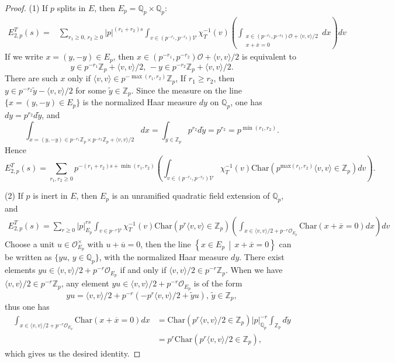 \documentclass[12pt]{article}
\theoremstyle{remark}
\theoremstyle{definition}
\newcommand{\oo}{\mathcal{O}}
\newcommand{\Z}{\mathbb{Z}}
\newcommand{\Q}{\mathbb{Q}}
\newcommand{\lrangle}[2]{\langle #1,#2\rangle}
\newcommand{\rmm}[1]{\mathrm{#1}}
\newcommand{\midline}{\,\middle\vert\,}
\newcommand{\set}[2]{\left\{#1\midline #2\right\}}
\newcommand{\call}[1]{\mathcal{#1}}
\begin{document}
\begin{proof}
    (1) If $p$ splits in $E$, then
$E_{p}=\Q_{p}\times\Q_{p}$:
\begin{align*}
    E_{2,p}^{T}(s)=&\sum_{r_{1}\geq 0,\,r_{2}\geq 0}|p|^{(r_{1}+r_{2})s}\int_{v\in (p^{-r_{1}},p^{-r_{2}})\call{V}}\chi_{T}^{-1}(v)\left(\int_{\substack{x\in (p^{-r_{1}},p^{-r_{2}})\oo+\lrangle{v}{v}/2\\ x+\overline{x}=0}}dx\right)dv
\end{align*}
If we write $x=(y,-y)\in E_{p}$,
then $x\in (p^{-r_{1}},p^{-r_{2}})\oo+\lrangle{v}{v}/2$ is equivalent to 
\[y\in p^{-r_{1}}\Z_{p}+\lrangle{v}{v}/2,\,-y\in p^{-r_{2}}\Z_{p}+\lrangle{v}{v}/2.\]
There are such $x$ only if $\lrangle{v}{v}\in p^{-\max(r_{1},r_{2})}\Z_{p}$,
If $r_{1}\geq r_{2}$,
then $y\in p^{-r_{2}}\widetilde{y}-\lrangle{v}{v}/2$ for some $\widetilde{y}\in \Z_{p}$.
Since the measure on the line $\{x=(y,-y)\in E_{p}\}$ is the normalized Haar measure $dy$ on $\Q_{p}$,
one has $dy=p^{r_{2}}d\widetilde{y}$,
and 
\[\int_{x=(y,-y)\in p^{-r_{1}}\Z_{p}\times p^{-r_{2}}\Z_{p}+\lrangle{v}{v}/2}dx=\int_{\widetilde{y}\in \Z_{p}}p^{r_{2}}d\widetilde{y}=p^{r_{2}}=p^{\min(r_{1},r_{2})}.\]
Hence
\[E_{2,p}^{T}(s)=\sum_{r_{1},r_{2}\geq 0}p^{-(r_{1}+r_{2})s+\min(r_{1},r_{2})}\left(\int_{v\in (p^{-r_{1}},p^{-r_{2}})\call{V}}\chi_{T}^{-1}(v)\rmm{Char}(p^{\rmm{max}(r_{1},r_{2})}\lrangle{v}{v}\in \Z_{p})dv\right).\]

(2) If $p$ is inert in $E$,
then $E_{p}$ is an unramified quadratic field extension of $\Q_{p}$, 
and 
\begin{align*}
    E_{2,p}^{T}(s)=\sum_{r\geq 0}|p|_{E_{p}}^{rs}\int_{v\in p^{-r}\call{V}}\chi_{T}^{-1}(v)\rmm{Char}(p^{r}\lrangle{v}{v}\in\Z_{p})\left(\int_{x\in\lrangle{v}{v}/2+p^{-r}\oo_{E_{p}}}\rmm{Char}(x+\overline{x}=0)dx\right)dv
\end{align*}
Choose a unit $u\in \oo_{E_{p}}^{\times}$ with $u+\overline{u}=0$,
then the line $\set{x\in E_{p}}{x+\overline{x}=0}$ can be written as $\{yu,\,y\in \Q_{p}\}$,
with the normalized Haar measure $dy$.
There exist elements $yu\in \lrangle{v}{v}/2+p^{-r}\oo_{E_{p}}$ if and only if $\lrangle{v}{v}/2\in p^{-r}\Z_{p}$.
When we have $\lrangle{v}{v}/2\in p^{-r}\Z_{p}$,
any element $yu\in\lrangle{v}{v}/2+p^{-r}\oo_{E_{p}}$ is of the form 
\[yu=\lrangle{v}{v}/2+p^{-r}\left(-p^{r}\lrangle{v}{v}/2+\widetilde{y}u\right),\,\widetilde{y}\in \Z_{p},\]
thus one has 
\begin{align*}
    \int_{x\in\lrangle{v}{v}/2+p^{-r}\oo_{E_{p}}}\rmm{Char}(x+\overline{x}=0)dx&=\rmm{Char}(p^{r}\lrangle{v}{v}/2\in\Z_{p})|p|_{\Q_{p}}^{-r}\int_{\Z_{p}}d\widetilde{y}\\
    &=p^{r}\rmm{Char}(p^{r}\lrangle{v}{v}/2\in\Z_{p}),    
\end{align*}
which gives us the desired identity.
\end{proof}     
\end{document}
